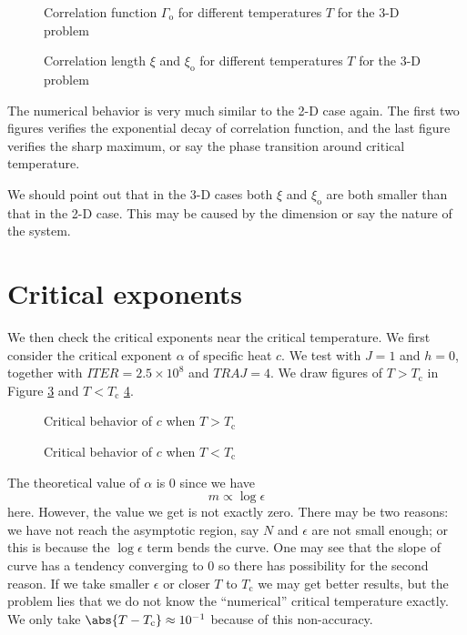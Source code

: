 \documentclass[english, nochinese]{pnote}
\begin{document}
\begin{figure}[htbp]
\centering

\caption{Correlation function $\Gamma_{\text{o}}$ for different temperatures $T$ for the 3-D problem}
\label{Fig:GammaO3D}
\end{figure}

\begin{figure}[htbp]
\centering

\caption{Correlation length $\xi$ and $\xi_{\text{o}}$ for different temperatures $T$ for the 3-D problem}
\label{Fig:Xi3D}
\end{figure}

The numerical behavior is very much similar to the 2-D case again. The first two figures verifies the exponential decay of correlation function, and the last figure verifies the sharp maximum, or say the phase transition around critical temperature.

We should point out that in the 3-D cases both $\xi$ and $\xi_{\text{o}}$ are both smaller than that in the 2-D case. This may be caused by the dimension or say the nature of the system.

\section{Critical exponents}

We then check the critical exponents near the critical temperature. We first consider the critical exponent $\alpha$ of specific heat $c$. We test with $ J = 1 $ and $ h = 0 $, together with $ \mathit{ITER} = 2.5 \times 10^8 $ and $ \mathit{TRAJ} = 4 $. We draw figures of $ T > T_{\text{c}} $ in Figure \ref{Fig:CritAlphaHigh} and $ T < T_{\text{c}} $ \ref{Fig:CritAlphaLow}.

\begin{figure}[htbp]
\centering
\scalebox{0.725}{}
\caption{Critical behavior of $c$ when $ T > T_{\text{c}}$}
\label{Fig:CritAlphaHigh}
\end{figure}

\begin{figure}[htbp]
\centering
\scalebox{0.725}{}
\caption{Critical behavior of $c$ when $ T < T_{\text{c}}$}
\label{Fig:CritAlphaLow}
\end{figure}

The theoretical value of $\alpha$ is $0$ since we have
\begin{equation}
m \propto \log \epsilon
\end{equation}
here. However, the value we get is not exactly zero. There may be two reasons: we have not reach the asymptotic region, say $N$ and $\epsilon$ are not small enough; or this is because the $ \log \epsilon $ term bends the curve. One may see that the slope of curve has a tendency converging to $0$ so there has possibility for the second reason. If we take smaller $\epsilon$ or closer $T$ to $T_{\text{c}}$ we may get better results, but the problem lies that we do not know the ``numerical'' critical temperature exactly. We only take $ \abs{ T - T_{\text{c}} } \approx 10^{-1} $ because of this non-accuracy.
\end{document}
